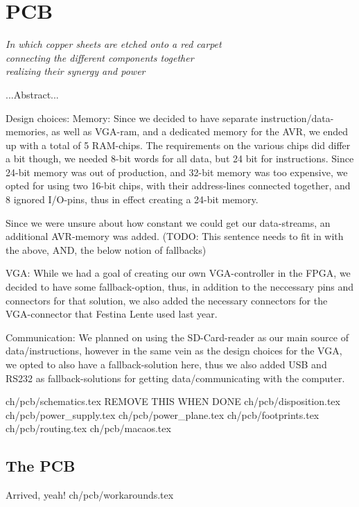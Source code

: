 \chapter {PCB}

\begin {flushright} {\slshape
    In which copper sheets are etched onto a red carpet\\
    connecting the different components together\\
    realizing their synergy and power
}
\end {flushright}
...Abstract...

Design choices:
Memory:
Since we decided to have separate instruction/data-memories, as well as VGA-ram, and
a dedicated memory for the AVR, we ended up with a total of 5 RAM-chips. The requirements
on the various chips did differ a bit though, we needed 8-bit words for all data, but
24 bit for instructions. Since 24-bit memory was out of production, and 32-bit memory
was too expensive, we opted for using two 16-bit chips, with their address-lines connected
together, and 8 ignored I/O-pins, thus in effect creating a 24-bit memory.

Since we were unsure about how constant we could get our data-streams, an additional
AVR-memory was added. (TODO: This sentence needs to fit in with the above, AND, the
below notion of fallbacks)

VGA:
While we had a goal of creating our own VGA-controller in the FPGA, we decided to have
some fallback-option, thus, in addition to the neccessary pins and connectors for that
solution, we also added the necessary connectors for the VGA-connector that Festina Lente
used last year.

Communication:
We planned on using the SD-Card-reader as our main source of data/instructions, however
in the same vein as the design choices for the VGA, we opted to also have a fallback-solution
here, thus we also added USB and RS232 as fallback-solutions for getting data/communicating
with the computer.

 {ch/pcb/schematics.tex}
REMOVE THIS WHEN DONE
 {ch/pcb/disposition.tex}
 {ch/pcb/power_supply.tex}
 {ch/pcb/power_plane.tex}
 {ch/pcb/footprints.tex}
 {ch/pcb/routing.tex}
 {ch/pcb/macaos.tex}
\section {The PCB}
Arrived, yeah!
 {ch/pcb/workarounds.tex}
